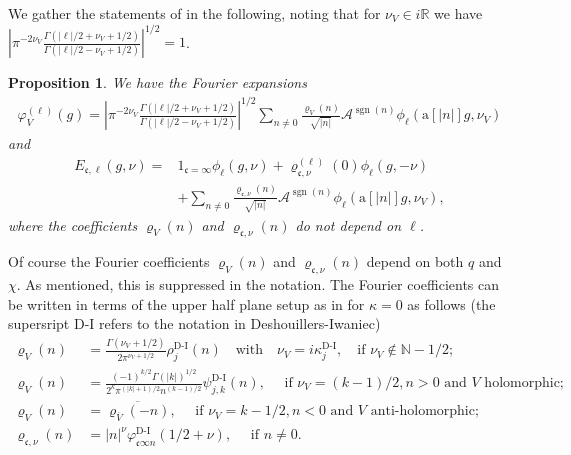 \documentclass[12pt]{amsart}
\newtheorem{proposition}[theorem]{Proposition}
\theoremstyle{definition}
\theoremstyle{remark}
\numberwithin{equation}{section}
\newcommand{\R}{{\mathbb R}}
\newcommand{\1}{{\mathbf 1}}
\newcommand{\sgn}{\operatorname{sgn}}
\begin{document}
We gather the statements of \cite[(17.3), (17.5), (18.2), (21.11), (24.3)]{motohashielements} in the following, noting that for $\nu_V \in i \R $ we have $\left|\pi^{-2\nu_V}\frac{\Gamma(|\ell|/2+\nu_V+1/2)}{\Gamma(|\ell|/2-\nu_V+1/2)} \right|^{1/2} = 1$.
\begin{proposition}\label{prop:fourierexpansionbasis}
We have the Fourier expansions
\begin{align*}
    \varphi_V^{(\ell)}(g)=\left|\pi^{-2\nu_V}\frac{\Gamma(|\ell|/2+\nu_V+1/2)}{\Gamma(|\ell|/2-\nu_V+1/2)} \right|^{1/2}\sum_{n\neq 0} \frac{\varrho_V(n)}{\sqrt{|n|}} \mathcal{A}^{\sgn(n)}\phi_{\ell}(\mathrm{a}[|n|]g,\nu_V)
\end{align*}
and
\begin{align*}
    E_{\mathfrak{c},\ell}(g,\nu)=&1_{\mathfrak{c}=\infty}\phi_\ell(g,\nu)+\varrho_{\mathfrak{c,\nu}}^{(\ell)}(0)\phi_\ell(g,-\nu)\\
    &+\sum_{n\neq 0}\frac{\varrho_{\mathfrak{c},\nu}(n)}{\sqrt{|n|}} \mathcal{A}^{\sgn(n)}\phi_{\ell}(\mathrm{a}[|n|]g,\nu_V),
\end{align*}
where the coefficients  $\varrho_V(n)$ and $\varrho_{\mathfrak{c},\nu}(n)$ do not depend on $\ell$.
\end{proposition}
Of course the Fourier coefficients $\varrho_{V}(n)$ and $\varrho_{\mathfrak{c},\nu}(n)$ depend on both $q$ and $\chi$. As mentioned, this is suppressed in the notation. The Fourier coefficients can be written in terms of the upper half plane setup as in \cite{deshoullieriwaniec} for $\kappa = 0$ as follows (the supersript D-I refers to the notation in Deshouillers-Iwaniec)
\begin{align*}
    \varrho_V(n)&=\frac{\Gamma(\nu_V+1/2)}{2 \pi^{\nu_V+1/2}} \rho^{\text{D-I}}_j(n) \quad \text{with}\quad \nu_V=i \kappa^{\text{D-I}}_j, \quad \text{if } \nu_V\not\in \mathbb{N}-1/2;\\
     \varrho_V(n)&=\frac{(-1)^{k/2} \Gamma(|k|)^{1/2}}{2^{k}\pi^{(|k|+1)/2} n^{(k-1)/2}} \psi^{\text{D-I}}_{j, k}(n), \quad \text{ if } \nu_V=(k-1)/2, n>0 \text{ and } V \text{ holomorphic}; \\
       \varrho_V(n)&=\overline{ \varrho_{\overline{V}}(-n)}, \quad \text{ if } \nu_V=k-1/2, n<0 \text{ and } V \text{ anti-holomorphic}; \\
    \varrho_{\mathfrak{c},\nu}(n)&=|n|^{\nu}\varphi^{\text{D-I}}_{\mathfrak{c}\infty n}(1/2+\nu),\quad \text{ if }n\neq 0.
\end{align*}
\end{document}
